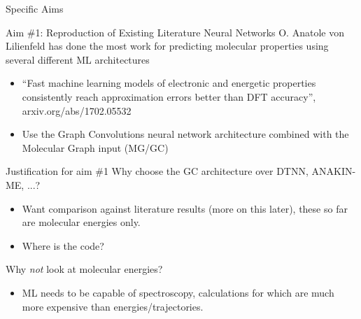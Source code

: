 \documentclass[xetex,compress]{beamer}
\begin{document}
\begin{frame}{Specific Aims}
\end{frame}

\begin{frame}{Aim \#1: Reproduction of Existing Literature Neural Networks}
  O. Anatole von Lilienfeld has done the most work for predicting molecular properties using several different ML architectures
  \begin{itemize}
  \item ``Fast machine learning models of electronic and energetic properties consistently reach approximation errors better than DFT accuracy'', arxiv.org/abs/1702.05532
  \item Use the Graph Convolutions neural network architecture combined with the Molecular Graph input (MG/GC)
  \end{itemize}
\end{frame}

\begin{frame}{Justification for aim \#1}
  Why choose the GC architecture over DTNN, ANAKIN-ME, ...?
  \begin{itemize}
  \item Want comparison against literature results (more on this later), these so far are molecular energies only.
  \item Where is the code?
  \end{itemize}
  Why \emph{not} look at molecular energies?
  \begin{itemize}
  \item ML needs to be capable of spectroscopy, calculations for which are much more expensive than energies/trajectories.
  \end{itemize}
\end{frame}
\end{document}
